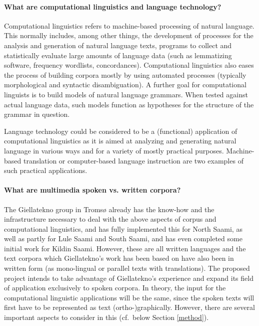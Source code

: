 \documentclass[a4paper,12pt]{article}
\begin{document}
\paragraph{What are computational linguistics and language technology?} Computational linguistics refers to machine-based processing of natural language. This normally includes, among other things, the development of processes for the analysis and generation of natural language texts, programs to collect and statistically evaluate large amounts of language data (such as lemmatizing software, frequency wordlists, concordances). Computational linguistics also eases the process of building corpora mostly by using automated processes (typically morphological and syntactic disambiguation). A further goal for computational linguists is to build models of natural language grammars. When tested against actual language data, such models function as hypotheses for the structure of the grammar in question. 

Language technology could be considered to be a (functional) application of computational linguistics as it is aimed at analyzing and generating natural language in various ways and for a variety of mostly practical purposes. Machine-based translation or computer-based language instruction are two examples of such practical applications.
 
\paragraph{What are multimedia spoken vs. written corpora?}
The Giellatekno group in Tromsø already has the know-how and the infrastructure necessary to deal with the above aspects of corpus and computational linguistics, and has fully implemented this for North Saami, as well as partly for Lule Saami and South Saami, and has even completed some initial work for Kildin Saami. However, these are all written languages and the text corpora which Giellatekno's work has been based on have also been in written form (as mono-lingual or parallel texts with translations). The proposed project intends to take advantage of Giellatekno's experience and expand its field of application exclusively to spoken corpora. In theory, the input for the computational linguistic applications will be the same, since the spoken texts will first have to be represented as text (ortho-)graphically. However, there are several important aspects to consider in this (cf.~below Section \ref{method}).
\end{document}
